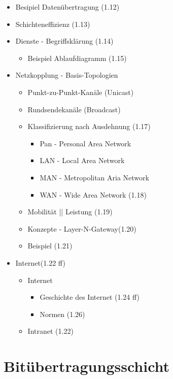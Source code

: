 \begin{itemize}
\begin{itemize}
	\end{itemize}
	\item Besipiel Datenübertragung (1.12)
	\item Schichteneffizienz (1.13)
	\item Dienste - Begriffsklärung (1.14)
	\begin{itemize}
		\item Beispiel Ablaufdiagramm (1.15)
	\end{itemize}
	\item Netzkopplung - Basis-Topologien
	\begin{itemize}
		\item Punkt-zu-Punkt-Kanäle (Unicast)
		\item Rundsendekanäle (Broadcast)
		\item Klassifizierung nach Ausdehnung (1.17)
		\begin{itemize}
			\item Pan - Personal Area Network
			\item LAN - Local Area Network
			\item MAN - Metropolitan Aria Network
			\item WAN - Wide Area Network (1.18)
		\end{itemize}
		\item Mobilität || Leistung (1.19)
		\item Konzepte - Layer-N-Gateway(1.20)
		\item Beispiel (1.21)
	\end{itemize}
	\item Internet(1.22 ff)
	\begin{itemize}
		\item Internet
		\begin{itemize}
			\item Geschichte des Internet (1.24 ff)
			\item Normen (1.26)
		\end{itemize}
		\item Intranet (1.22)
	\end{itemize}
\end{itemize}

\section{Bitübertragungsschicht}
